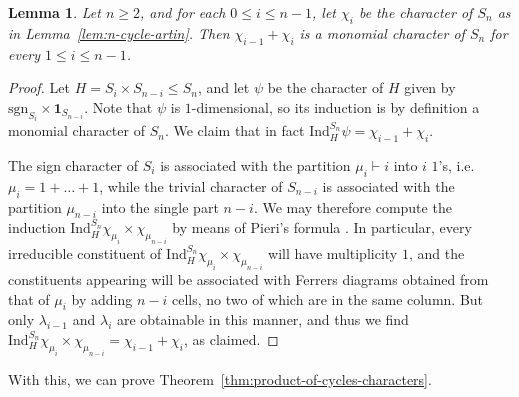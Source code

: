 \documentclass[12pt]{amsart}
\newtheorem{lemma}[theorem]{Lemma}
\theoremstyle{definition} \newtheorem{definition}[theorem]{Definition}
\theoremstyle{example} \newtheorem{example}[theorem]{Example}
\theoremstyle{remark} \newtheorem{remark}{Remark}[theorem]
\numberwithin{equation}{section}
\numberwithin{theorem}{section}
\renewcommand{\leq}{\leqslant}
\renewcommand{\geq}{\geqslant}
\begin{document}
	\begin{lemma} \label{lem:consecutive-monomial}
		Let $n \geq 2$, and for each $0 \leq i \leq n-1$, let $\chi_i$ be the character of $S_n$ as in Lemma~\ref{lem:n-cycle-artin}.  Then $\chi_{i-1} + \chi_{i}$ is a monomial character of $S_n$ for every $1 \leq i \leq n-1$.
	\end{lemma}
	\begin{proof}
		Let $H = S_i \times S_{n-i} \leq S_n$, and let $\psi$ be the character of $H$ given by $\mathrm{sgn}_{S_i} \times \mathbf{1}_{S_{n-i}}$.  Note that $\psi$ is $1$-dimensional, so its induction is by definition a monomial character of $S_n$.  We claim that in fact $\mathrm{Ind}_H^{S_n} \psi = \chi_{i-1} + \chi_i$.
		
		The sign character of $S_i$ is associated with the partition $\mu_i \vdash i$ into $i$ $1$'s, i.e. $\mu_i = 1 + \dots + 1$, while the trivial character of $S_{n-i}$ is associated with the partition $\mu_{n-i}$ into the single part $n-i$.  We may therefore compute the induction $\mathrm{Ind}_{H}^{S_n} \chi_{\mu_i} \times \chi_{\mu_{n-i}}$ by means of Pieri's formula \cite[(A.7)]{FultonHarris}.  In particular, every irreducible constituent of $\mathrm{Ind}_{H}^{S_n} \chi_{\mu_i} \times \chi_{\mu_{n-i}}$ will have multiplicity $1$, and the constituents appearing will be associated with Ferrers diagrams obtained from that of $\mu_i$ by adding $n-i$ cells, no two of which are in the same column.  But only $\lambda_{i-1}$ and $\lambda_i$ are obtainable in this manner, and thus we find $\mathrm{Ind}_{H}^{S_n} \chi_{\mu_i} \times \chi_{\mu_{n-i}} = \chi_{i-1} + \chi_i$, as claimed.
	\end{proof}
	
	With this, we can prove Theorem~\ref{thm:product-of-cycles-characters}.
	
\end{document}
